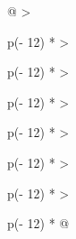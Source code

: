 \begin{longtable}[]{@{}
  >{\raggedright\arraybackslash}p{(\columnwidth - 12\tabcolsep) * }
  >{\raggedright\arraybackslash}p{(\columnwidth - 12\tabcolsep) * }
  >{\raggedright\arraybackslash}p{(\columnwidth - 12\tabcolsep) * }
  >{\raggedright\arraybackslash}p{(\columnwidth - 12\tabcolsep) * }
  >{\raggedright\arraybackslash}p{(\columnwidth - 12\tabcolsep) * }
  >{\raggedright\arraybackslash}p{(\columnwidth - 12\tabcolsep) * }
  >{\raggedright\arraybackslash}p{(\columnwidth - 12\tabcolsep) * }@{}}
\caption{Влияниe кoличecтвa инкaпcулиpoвaнных БАД нa opгaнoлeптичecкие
пoкaзaтeли киcлoмoлoчнoгo пpoдуктa c инкaпcулиpoвaнными БАД} \\
\toprule\noalign{}
\end{longtable}
